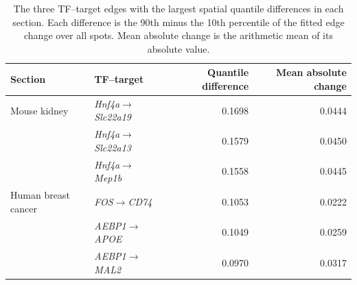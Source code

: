 \begin{table}[htbp]
\centering\small
\caption{The three TF--target edges with the largest spatial quantile differences in each section. Each difference is the 90th minus the 10th percentile of the fitted edge change over all spots. Mean absolute change is the arithmetic mean of its absolute value.}
\label{tab:caseedgevariation}
\begin{tabular}{llrr}\hline
Section & TF--target & Quantile difference & Mean absolute change\\\hline
Mouse kidney & \textit{Hnf4a}$\rightarrow$\textit{Slc22a19} & 0.1698 & 0.0444\\
 & \textit{Hnf4a}$\rightarrow$\textit{Slc22a13} & 0.1579 & 0.0450\\
 & \textit{Hnf4a}$\rightarrow$\textit{Mep1b} & 0.1558 & 0.0445\\
Human breast cancer & \textit{FOS}$\rightarrow$\textit{CD74} & 0.1053 & 0.0222\\
 & \textit{AEBP1}$\rightarrow$\textit{APOE} & 0.1049 & 0.0259\\
 & \textit{AEBP1}$\rightarrow$\textit{MAL2} & 0.0970 & 0.0317\\
\hline\end{tabular}
\end{table}

